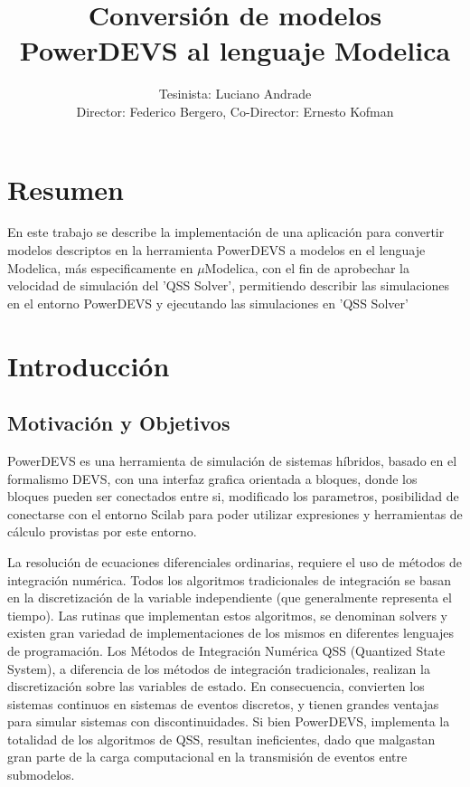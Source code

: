 \documentclass[a4paper,	11pt]{article}
\begin{document}
\renewcommand\floatpagefraction{.9}
\renewcommand\topfraction{.9}
\renewcommand\bottomfraction{.9}
\renewcommand\textfraction{.1}
\setcounter{totalnumber}{50}
\setcounter{topnumber}{50}
\setcounter{bottomnumber}{50}

\title{Conversión de modelos PowerDEVS al lenguaje Modelica}
\author{Tesinista: Luciano Andrade \\ Director: Federico Bergero, Co-Director: Ernesto Kofman} 

\maketitle
\section{Resumen}
En este trabajo se describe la implementación de una aplicación para convertir modelos descriptos en la herramienta PowerDEVS a modelos en el lenguaje Modelica, más especificamente en $\mu$Modelica, con el fin de aprobechar la velocidad de simulación del 'QSS Solver', permitiendo describir las simulaciones en el entorno PowerDEVS y ejecutando las simulaciones en 'QSS Solver'


\section{Introducción}
\subsection{Motivación y Objetivos}
PowerDEVS es una herramienta de simulación de sistemas híbridos, basado en el formalismo DEVS, con una interfaz grafica orientada a bloques, donde los bloques pueden ser conectados entre si, modificado los parametros, posibilidad de conectarse con el entorno Scilab para poder utilizar expresiones y herramientas de cálculo provistas por este entorno.

La resolución de ecuaciones diferenciales ordinarias, requiere el uso de métodos de integración numérica. Todos los algoritmos tradicionales de integración se basan en la discretización de la variable independiente (que generalmente representa el tiempo). Las rutinas que implementan estos algoritmos, se denominan solvers y existen gran variedad de implementaciones de los mismos en diferentes lenguajes de programación. Los Métodos de Integración Numérica QSS (Quantized State System), a diferencia de los métodos de integración tradicionales, realizan la discretización sobre las variables de estado. En consecuencia, convierten los sistemas continuos en sistemas de eventos discretos, y tienen grandes ventajas para simular sistemas con discontinuidades.
Si bien PowerDEVS, implementa la totalidad de los algoritmos de QSS, resultan ineficientes, dado que malgastan gran parte de la carga computacional en la transmisión de eventos entre submodelos.
\end{document}
